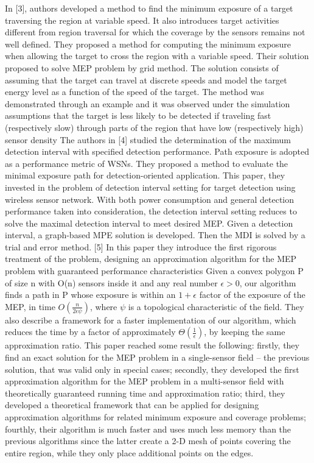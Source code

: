 \documentclass[final]{elsarticle}
\begin{document}
In [3], authors developed a method to find the minimum exposure of a target traversing the region at variable speed. It also introduces target activities different from region traversal for which the coverage by the sensors remains not well defined. They proposed a method for computing the minimum exposure when allowing the target to cross the region with a variable speed. Their solution proposed to solve MEP problem by grid method. The solution consists of assuming that the target can travel at discrete speeds and model the target energy level as a function of the speed of the target. The method was demonstrated through an example and it was observed under the simulation assumptions that the target is less likely to be detected if traveling fast (respectively slow) through parts of the region that have low (respectively high) sensor density
The authors in [4] studied the determination of the maximum detection interval with specified detection performance. Path exposure is adopted as a performance metric of WSNs. They proposed a method to evaluate the minimal exposure path for detection-oriented application. This paper, they invested in the problem of detection interval setting for target detection using wireless sensor network. With both power consumption and general detection performance taken into consideration, the detection interval setting reduces to solve the maximal detection interval to meet desired MEP. Given a detection interval, a graph-based MPE solution is developed. Then the MDI is solved by a trial and error method.
[5] In this paper they introduce the first rigorous treatment of the problem, designing an approximation algorithm for the MEP problem with guaranteed performance characteristics Given a convex polygon P of size n with O(n) sensors inside it and any real number $ \epsilon > 0 $, our algorithm finds a path in P whose exposure is within an $ 1 +\epsilon $ factor of the exposure of the MEP, in time $ O(\frac{n}{2\epsilon\psi}) $, where $\psi$ is a topological characteristic of the field. They also describe a framework for a faster implementation of our algorithm, which reduces the time by a factor of approximately $\Theta(\frac{1}{\epsilon})$, by keeping the same approximation ratio. This paper reached some result the following: firstly, they find an exact solution for the MEP problem in a single-sensor field – the previous solution, that  was valid only in special cases; secondly, they developed the first approximation algorithm for the MEP problem in a multi-sensor field with theoretically guaranteed running time and approximation ratio; third, they developed a theoretical framework that can be applied for designing approximation algorithms for related minimum exposure and coverage problems; fourthly,  their algorithm is much faster and uses much less memory than the previous algorithms since the latter create a 2-D mesh of points covering the entire region, while they only place additional points on the edges.
\end{document}
